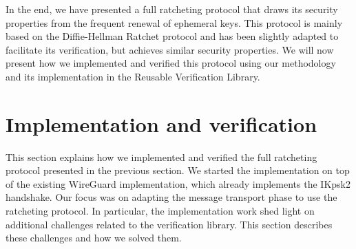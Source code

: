 
In the end, we have presented a full ratcheting protocol that draws its security properties from the frequent renewal of ephemeral keys. This protocol is mainly based on the Diffie-Hellman Ratchet protocol and has been slightly adapted to facilitate its verification, but achieves similar security properties.
We will now present how we implemented and verified this protocol using our methodology and its implementation in the Reusable Verification Library. 

\section{Implementation and verification}
\label{sec:implementation-and-verification}

This section explains how we implemented and verified the full ratcheting protocol presented in the previous section.
We started the implementation on top of the existing WireGuard implementation, which already implements the IKpsk2 handshake.
Our focus was on adapting the message transport phase to use the ratcheting protocol.
In particular, the implementation work shed light on additional challenges related to the verification library. This section describes these challenges and how we solved them.

